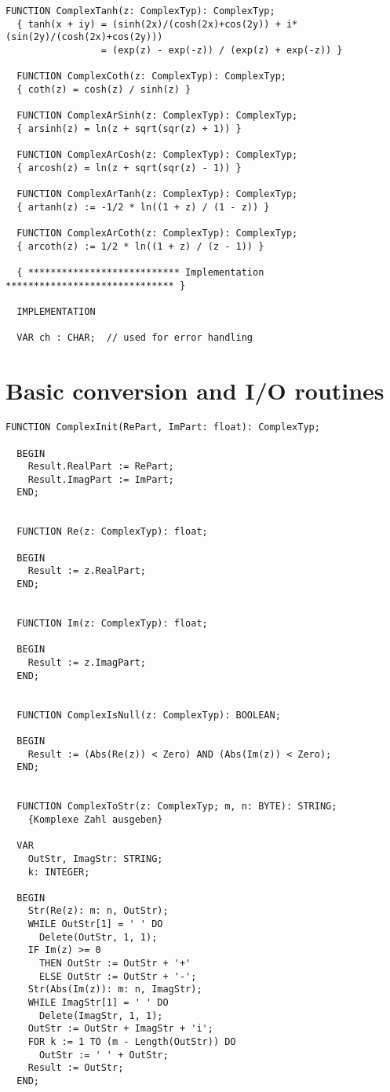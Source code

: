 \begin{refsection}
\begin{lstlisting}[caption=Interface of \texttt{Complex}]
  FUNCTION ComplexTanh(z: ComplexTyp): ComplexTyp;
  { tanh(x + iy) = (sinh(2x)/(cosh(2x)+cos(2y)) + i*(sin(2y)/(cosh(2x)+cos(2y)))
                 = (exp(z) - exp(-z)) / (exp(z) + exp(-z)) }

  FUNCTION ComplexCoth(z: ComplexTyp): ComplexTyp;
  { coth(z) = cosh(z) / sinh(z) }

  FUNCTION ComplexArSinh(z: ComplexTyp): ComplexTyp;
  { arsinh(z) = ln(z + sqrt(sqr(z) + 1)) }

  FUNCTION ComplexArCosh(z: ComplexTyp): ComplexTyp;
  { arcosh(z) = ln(z + sqrt(sqr(z) - 1)) }

  FUNCTION ComplexArTanh(z: ComplexTyp): ComplexTyp;
  { artanh(z) := -1/2 * ln((1 + z) / (1 - z)) }

  FUNCTION ComplexArCoth(z: ComplexTyp): ComplexTyp;
  { arcoth(z) := 1/2 * ln((1 + z) / (z - 1)) }

  { *************************** Implementation ****************************** }

  IMPLEMENTATION

  VAR ch : CHAR;  // used for error handling
\end{lstlisting}

\section{Basic conversion and I/O routines}

\begin{lstlisting}[caption=Conversion and I/O routines]
  FUNCTION ComplexInit(RePart, ImPart: float): ComplexTyp;

  BEGIN
    Result.RealPart := RePart;
    Result.ImagPart := ImPart;
  END;


  FUNCTION Re(z: ComplexTyp): float;

  BEGIN
    Result := z.RealPart;
  END;


  FUNCTION Im(z: ComplexTyp): float;

  BEGIN
    Result := z.ImagPart;
  END;


  FUNCTION ComplexIsNull(z: ComplexTyp): BOOLEAN;

  BEGIN
    Result := (Abs(Re(z)) < Zero) AND (Abs(Im(z)) < Zero);
  END;


  FUNCTION ComplexToStr(z: ComplexTyp; m, n: BYTE): STRING;
    {Komplexe Zahl ausgeben}

  VAR
    OutStr, ImagStr: STRING;
    k: INTEGER;

  BEGIN
    Str(Re(z): m: n, OutStr);
    WHILE OutStr[1] = ' ' DO
      Delete(OutStr, 1, 1);
    IF Im(z) >= 0
      THEN OutStr := OutStr + '+'
      ELSE OutStr := OutStr + '-';
    Str(Abs(Im(z)): m: n, ImagStr);
    WHILE ImagStr[1] = ' ' DO
      Delete(ImagStr, 1, 1);
    OutStr := OutStr + ImagStr + 'i';
    FOR k := 1 TO (m - Length(OutStr)) DO
      OutStr := ' ' + OutStr;
    Result := OutStr;
  END;
\end{lstlisting}


\end{refsection}
